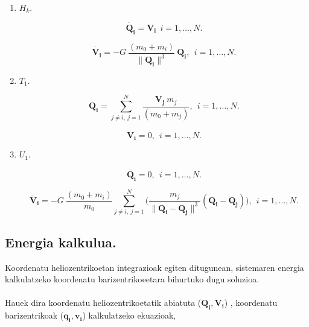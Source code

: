 \begin{enumerate}
\item $H_k$.

\begin{equation*}
\dot{\mathbf{Q_i}}=\mathbf{V_i} \ \ i=1,\dots, N.
\end{equation*}

\begin{equation*}
\dot{\mathbf{V_i}}= - G  \ \frac{(m_0+m_i)}{\|\mathbf{Q_i}\|^3 }\ \mathbf{Q_i},  \ \ i=1,\dots, N.
\end{equation*}

\item $T_1$.

\begin{equation*}
\dot{\mathbf{Q_i}}=\sum\limits_{j\ne i,\ j=1}^{N} \frac{\mathbf{V_j} \ m_j}{(m_0+m_j)}, \ \ i=1,\dots, N.
\end{equation*}

\begin{equation*}
\dot{\mathbf{V_i}}= 0, \ \ i=1,\dots, N.
\end{equation*}

\item $U_1$.

\begin{equation*}
\dot{\mathbf{Q_i}}=0, \ \ i=1,\dots, N.
\end{equation*}

\begin{equation*}
\dot{\mathbf{V_i}}= -G \ \frac{(m_0+m_i)}{m_0}
                    \sum\limits_{j \ne i , \ j=1}^{N} \bigg( \frac{m_j}{\|\mathbf{Q_i}-\mathbf{Q_j}\|^3} (\mathbf{Q_i-\mathbf{Q_j}})     \bigg), \ \ i=1,\dots, N.
\end{equation*}

\end{enumerate}


\subsection*{Energia kalkulua.}

Koordenatu heliozentrikoetan integrazioak egiten ditugunean, sistemaren energia kalkulatzeko koordenatu barizentrikoeetara bihurtuko dugu soluzioa.

\paragraph*{} Hauek dira koordenatu heliozentrikoetatik abiatuta ($\mathbf{Q_i},\mathbf{V_i}$) , koordenatu barizentrikoak ($\mathbf{q_i},\mathbf{v_i}$) kalkulatzeko ekuazioak,

